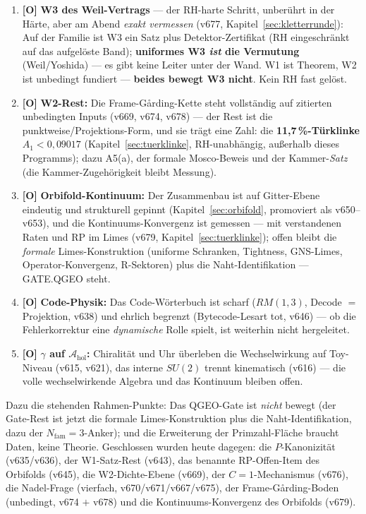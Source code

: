 \documentclass[11pt,a4paper]{article}
\newcommand{\OO}{\textcolor{offen}{\textbf{[O]}}}
\begin{document}
\begin{enumerate}
\item \OO{} \textbf{W3 des Weil-Vertrags} --- der RH-harte Schritt,
      unberührt in der Härte, aber am Abend \emph{exakt vermessen}
      (v677, Kapitel~\ref{sec:kletterrunde}): Auf der Familie ist W3
      ein Satz plus Detektor-Zertifikat (\glqq{}RH eingeschränkt auf
      das aufgelöste Band\grqq{}); \textbf{uniformes W3 \emph{ist}
      die Vermutung} (Weil/Yoshida) --- es gibt keine Leiter unter
      der Wand. W1 ist Theorem, W2 ist unbedingt fundiert ---
      \textbf{beides bewegt W3 nicht}. Kein \glqq{}RH fast
      gelöst\grqq{}.
\item \OO{} \textbf{W2-Rest:} Die Frame-Gårding-Kette steht
      vollständig auf zitierten unbedingten Inputs (v669, v674,
      v678) --- der Rest ist die punktweise/Projektions-Form, und
      sie trägt eine Zahl: die \textbf{11{,}7\,\%-Türklinke}
      $A_1 < 0{,}09017$ (Kapitel~\ref{sec:tuerklinke},
      RH-unabhängig, außerhalb dieses Programms); dazu A5(a), der
      formale Mosco-Beweis und der Kammer-\emph{Satz} (die
      Kammer-Zugehörigkeit bleibt Messung).
\item \OO{} \textbf{Orbifold-Kontinuum:} Der Zusammenbau ist auf
      Gitter-Ebene eindeutig und strukturell gepinnt
      (Kapitel~\ref{sec:orbifold}, promoviert als v650--v653), und
      die Kontinuums-Konvergenz ist gemessen --- mit verstandenen
      Raten und RP im Limes (v679, Kapitel~\ref{sec:tuerklinke});
      offen bleibt die \emph{formale} Limes-Konstruktion (uniforme
      Schranken, Tightness, GNS-Limes, Operator-Konvergenz,
      R-Sektoren) plus die Naht-Identifikation --- GATE.QGEO steht.
\item \OO{} \textbf{Code-Physik:} Das Code-Wörterbuch ist scharf
      ($RM(1,3)$, Decode $=$ Projektion, v638) und ehrlich begrenzt
      (Bytecode-Lesart tot, v646) --- ob die Fehlerkorrektur eine
      \emph{dynamische} Rolle spielt, ist weiterhin nicht
      hergeleitet.
\item \OO{} \textbf{$\gamma$ auf $\mathcal{A}_{\mathrm{hol}}$:}
      Chiralität und Uhr überleben die Wechselwirkung auf Toy-Niveau
      (v615, v621), das interne $SU(2)$ trennt kinematisch (v616)
      --- die volle wechselwirkende Algebra und das Kontinuum
      bleiben offen.
\end{enumerate}

Dazu die stehenden Rahmen-Punkte: Das QGEO-Gate ist \emph{nicht}
bewegt (der Gate-Rest ist jetzt die formale Limes-Konstruktion
plus die Naht-Identifikation, dazu der $N_{\mathrm{fam}} =
3$-Anker); und die Erweiterung der Primzahl-Fläche braucht Daten,
keine Theorie. Geschlossen wurden heute dagegen: die
$P$-Kanonizität (v635/v636), der W1-Satz-Rest (v643), das benannte
RP-Offen-Item des Orbifolds (v645), die W2-Dichte-Ebene (v669),
der $C = 1$-Mechanismus (v676), die Nadel-Frage (vierfach,
v670/v671/v667/v675), der Frame-Gårding-Boden (unbedingt, v674 $+$
v678) und die Kontinuums-Konvergenz des Orbifolds (v679).
\end{document}

